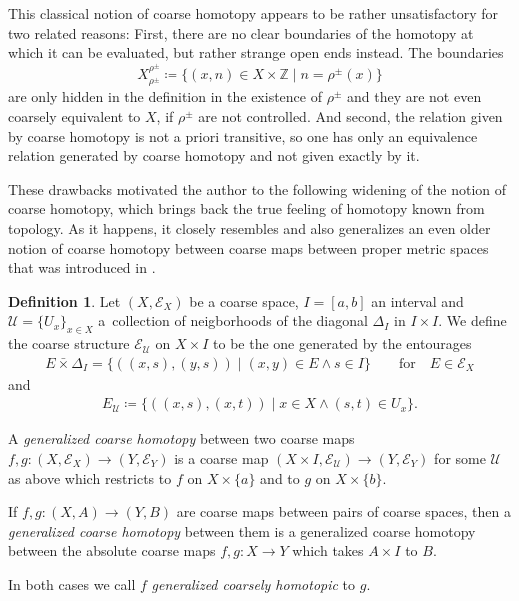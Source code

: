 \documentclass[pdftex]{sigma}
\numberwithin{equation}{section}
\theoremstyle{definition}
\newtheorem{defn}[thm]{Definition}
\newcommand{\Z}{\mathbb{Z}}
\newcommand{\cU}{\mathcal{U}}
\newcommand{\coarseStr}{\mathcal{E}}
\newcommand{\Diag}[1][]{{\Delta_{#1}}}
\newcommand{\swapcross}{\mathbin{\bar\times}}
\begin{document}
This classical notion of coarse homotopy appears to be rather unsatisfactory for two related reasons: First, there are no clear boundaries of the homotopy at which it can be evaluated, but rather strange open ends instead. The boundaries
\[
X_{\rho^\pm}^{\rho^\pm}\coloneqq\big\{(x,n)\in X\times\Z\mid n=\rho^\pm(x)\big\}
\]
are only hidden in the definition in the existence of $\rho^\pm$ and they are not even coarsely equivalent to $X$, if $\rho^\pm$ are not controlled. And second, the relation given by coarse homotopy is not a priori transitive, so one has only an equivalence relation generated by coarse homotopy and not given exactly by it.

These drawbacks motivated the author to the following widening of the notion of coarse homotopy, which brings back the true feeling of homotopy known from topology. As it happens, it closely resembles and also generalizes an even older notion of coarse homotopy between coarse maps between proper metric spaces that was introduced in \cite[Definitions 1.2 and~1.3]{HigsonRoeHomotopy}.


\begin{defn}\label{def:coarsehomotopy}
Let $(X,\coarseStr_X)$ be a coarse space, $I=[a,b]$ an interval and $\cU= \{U_x\}_{x\in X}$ a~collection of neigborhoods of the diagonal $\Diag[I]$ in $I\times I$.
We define the coarse structure $\coarseStr_{\cU}$ on $X\times I$ to be the one generated by the entourages
\begin{gather*}
E\swapcross\Diag[I]=\{((x,s),(y,s))\mid (x,y)\in E\wedge s\in I\}\qquad\text{for}\quad
E\in\coarseStr_X
\end{gather*}
and
\begin{gather*}
E_{\cU}\coloneqq\{((x,s),(x,t))\mid x\in X\wedge (s,t)\in U_x\}.
\end{gather*}

A \emph{generalized coarse homotopy} between two coarse maps $f,g\colon (X,\coarseStr_X)\to (Y,\coarseStr_Y)$ is a coarse map $(X\times I,\coarseStr_\cU)\to (Y,\coarseStr_Y)$ for some $\cU$ as above which restricts to $f$ on $X\times\{a\}$ and to $g$ on $X\times\{b\}$.


If $f,g\colon (X,A)\to (Y,B)$ are coarse maps between pairs of coarse spaces, then a \emph{generalized coarse homotopy} between them is a generalized coarse homotopy between the absolute coarse maps $f,g\colon X\to Y$ which takes $A\times I$ to $B$.

In both cases we call $f$ \emph{generalized coarsely homotopic} to $g$.
\end{defn}
\end{document}
